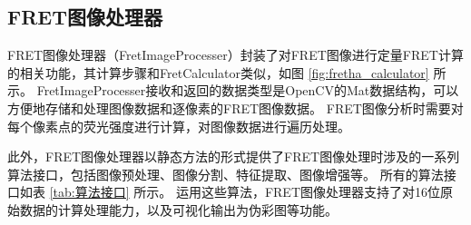 \subsection{FRET图像处理器}
FRET图像处理器（FretImageProcesser）封装了对FRET图像进行定量FRET计算的相关功能，其计算步骤和FretCalculator类似，如图 \ref{fig:fretha_calculator} 所示。
FretImageProcesser接收和返回的数据类型是OpenCV的Mat数据结构，可以方便地存储和处理图像数据和逐像素的FRET图像数据。
FRET图像分析时需要对每个像素点的荧光强度进行计算，对图像数据进行遍历处理。

此外，FRET图像处理器以静态方法的形式提供了FRET图像处理时涉及的一系列算法接口，包括图像预处理、图像分割、特征提取、图像增强等。
所有的算法接口如表 \ref{tab:算法接口} 所示。
运用这些算法，FRET图像处理器支持了对16位原始数据的计算处理能力，以及可视化输出为伪彩图等功能。


